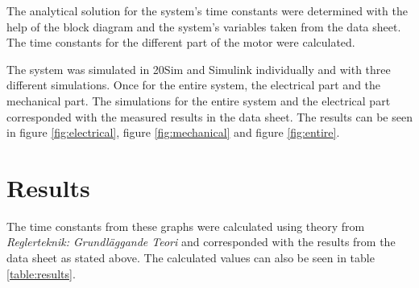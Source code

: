 \documentclass[12pt,a4paper]{article}
\begin{document}
The analytical solution for the system's time constants were determined with the help of the block diagram and the system's variables taken from the data sheet. The time constants for the different part of the motor were calculated.

The system was simulated in 20Sim and Simulink individually and with three different simulations. Once for the entire system, the electrical part and the mechanical part. The simulations for the entire system and the electrical part corresponded with the measured results in the data sheet. The results can be seen in figure \ref{fig:electrical}, figure \ref{fig:mechanical} and figure \ref{fig:entire}.

\section{Results}
The time constants from these graphs were calculated using theory from \textit{Reglerteknik: Grundläggande Teori} \cite{regler} and corresponded with the results from the data sheet as stated above. The calculated values can also be seen in table \ref{table:results}.
\end{document}
